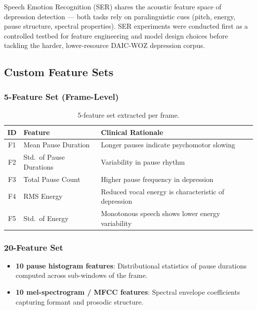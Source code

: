 Speech Emotion Recognition (SER) shares the acoustic feature space of depression detection — both tasks rely on paralinguistic cues (pitch, energy, pause structure, spectral properties). SER experiments were conducted first as a controlled testbed for feature engineering and model design choices before tackling the harder, lower-resource DAIC-WOZ depression corpus.

\subsection{Custom Feature Sets}

\subsubsection{5-Feature Set (Frame-Level)}
\begin{table}[h]
\centering
\caption{5-feature set extracted per frame.}
\label{tab:5feat}
\begin{tabular}{@{}clp{7cm}@{}}
\toprule
\textbf{ID} & \textbf{Feature} & \textbf{Clinical Rationale} \\
\midrule
F1 & Mean Pause Duration      & Longer pauses indicate psychomotor slowing \\
F2 & Std.\ of Pause Durations & Variability in pause rhythm \\
F3 & Total Pause Count        & Higher pause frequency in depression \\
F4 & RMS Energy               & Reduced vocal energy is characteristic of depression \\
F5 & Std.\ of Energy          & Monotonous speech shows lower energy variability \\
\bottomrule
\end{tabular}
\end{table}

\subsubsection{20-Feature Set}
\begin{itemize}
    \item \textbf{10 pause histogram features}: Distributional statistics of pause durations computed across sub-windows of the frame.
    \item \textbf{10 mel-spectrogram / MFCC features}: Spectral envelope coefficients capturing formant and prosodic structure.
\end{itemize}

